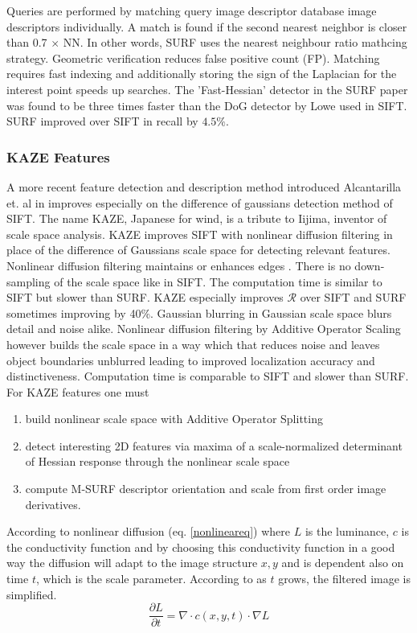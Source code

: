 \documentclass[english,12pt,a4paper,pdftex,elec,utf8, table]{aaltothesis}
\begin{document}
Queries are performed by matching query image descriptor database image descriptors individually. A match is found if the second nearest neighbor is closer than 0.7 $\times$ NN. In other words, SURF uses the nearest neighbour ratio mathcing strategy. Geometric verification reduces false positive count (FP). Matching requires fast indexing and additionally storing the sign of the Laplacian for the interest point speeds up searches. The 'Fast-Hessian' detector in the SURF paper was found to be three times faster than the DoG detector by Lowe used in SIFT. SURF improved over SIFT in recall by $4.5\%$. \cite{Bay2006}

\subsubsection{KAZE Features}
A more recent feature detection and description method introduced Alcantarilla et. al in \cite{Alcantarilla2012} improves especially on the difference of gaussians detection method of SIFT. The name KAZE, Japanese for wind, is a tribute to Iijima, inventor of scale space analysis. KAZE improves SIFT with nonlinear diffusion filtering in place of the difference of Gaussians scale space for detecting relevant features. Nonlinear diffusion filtering maintains or enhances edges \cite{Weickert1998}. There is no down-sampling of the scale space like in SIFT. The computation time is similar to SIFT but slower than SURF. KAZE especially improves $\mathcal{R}$ over SIFT and SURF sometimes improving by 40\%. Gaussian blurring in Gaussian scale space blurs detail and noise alike. Nonlinear diffusion filtering by Additive Operator Scaling however builds the scale space in a way which that reduces noise and leaves object boundaries unblurred leading to improved localization accuracy and distinctiveness. Computation time is comparable to SIFT and slower than SURF. For KAZE features one must
\begin{enumerate}
\item build nonlinear scale space with Additive Operator Splitting
\item detect interesting 2D features via maxima of a scale-normalized determinant of Hessian response through the nonlinear scale space
\item compute M-SURF descriptor orientation and scale from first order image derivatives.
\end{enumerate}
According to \cite{Alcantarilla2013} nonlinear diffusion (eq. \ref{nonlineareq}) where $L$ is the luminance, $c$ is the conductivity function and by choosing this conductivity function in a good way the diffusion will adapt to the image structure $x, y$ and is dependent also on time $t$, which is the scale parameter. According to  \cite{Alcantarilla2012} as $t$ grows, the filtered image is simplified.
\begin{equation}
  \label{nonlineareq}
  \frac{\partial L}{\partial t} = \nabla \cdot c(x,y,t)\cdot\nabla L
\end{equation}
\end{document}
